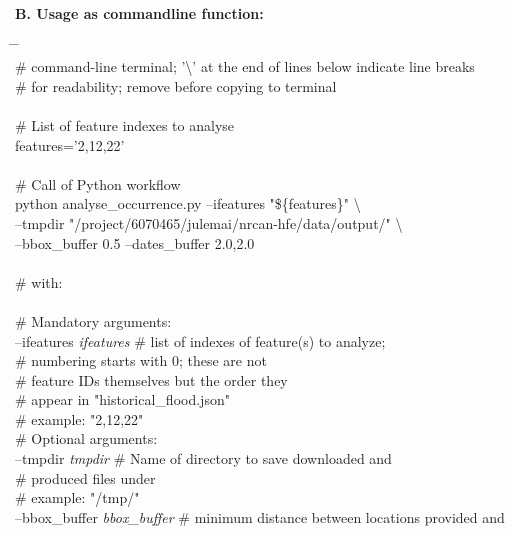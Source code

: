 \documentclass[10pt,a4paper,titlepage,parskip]{scrartcl}
\newenvironment{ttfont}{\fontfamily{\ttdefault}\selectfont}{\par}
\newcommand{\GRAU}[1]{\textcolor{ufzgray2}{#1}}
\begin{document}
\textbf{B. Usage as commandline function:}
\begin{framed}
	\vspace*{-1.2cm}
	\begin{ttfont}
		\begin{tabbing}
			\hspace{0.5cm} \= \hspace{5.2cm} \= \kill \\[4pt]
			\GRAU{\# command-line terminal; '\textbackslash' at the end of lines below indicate line breaks}\\
			\GRAU{\# for readability; remove before copying to terminal}\\
			\\
			\GRAU{\# List of feature indexes to analyse}\\
			features='2,12,22'\\
			\\
			\GRAU{\# Call of Python workflow}\\
			python analyse\_occurrence.py --ifeatures "\$\{features\}" \textbackslash \\
			\> --tmpdir "/project/6070465/julemai/nrcan-hfe/data/output/" \textbackslash \\
			\> --bbox\_buffer 0.5 --dates\_buffer 2.0,2.0 \\
			\\
			\GRAU{\# with:}\\
			\\
			\> \GRAU{\# Mandatory arguments:}\\
			\> --ifeatures \textit{ifeatures} \> \GRAU{\# list of indexes of feature(s) to analyze;}\\
			\> \> \GRAU{\# numbering starts with 0; these are not }\\
			\> \> \GRAU{\# feature IDs themselves but the order they }\\
			\> \> \GRAU{\# appear in "historical\_flood.json"}\\
			\> \> \GRAU{\# example: "2,12,22"}\\
			\> \GRAU{\# Optional arguments:}\\
			\> --tmpdir \textit{tmpdir} \> \GRAU{\# Name of directory to save downloaded and}\\
			\> \> \GRAU{\# produced files under}\\
			\> \> \GRAU{\# example: "/tmp/"}\\
			\> --bbox\_buffer \textit{bbox\_buffer} \> \GRAU{\# minimum distance between locations provided and}\\

\end{tabbing}
\end{ttfont}
\end{framed}
\end{document}
